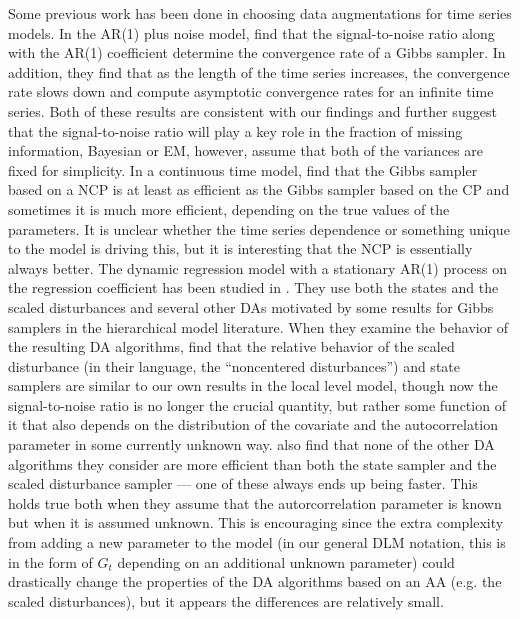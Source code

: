 \documentclass{article}
\begin{document}
Some previous work has been done in choosing data augmentations for time series models. In the AR(1) plus noise model, \citet{pitt1999analytic} find that the signal-to-noise ratio along with the AR(1) coefficient determine the convergence rate of a Gibbs sampler. In addition, they find that as the length of the time series increases, the convergence rate slows down and compute asymptotic convergence rates for an infinite time series. Both of these results are consistent with our findings and further suggest that the signal-to-noise ratio will play a key role in the fraction of missing information, Bayesian or EM, however, \citet{pitt1999analytic} assume that both of the variances are fixed for simplicity. In a continuous time model, \citet{roberts2004bayesian} find that the Gibbs sampler based on a NCP is at least as efficient as the Gibbs sampler based on the CP and sometimes it is much more efficient, depending on the true values of the parameters. It is unclear whether the time series dependence or something unique to the model is driving this, but it is interesting that the NCP is essentially always better. The dynamic regression model with a stationary AR(1) process on the regression coefficient has been studied in \citet{fruhwirth2004efficient}. They use both the states and the scaled disturbances and several other DAs motivated by some results for Gibbs samplers in the hierarchical model literature. When they examine the behavior of the resulting DA algorithms, \citet{fruhwirth2004efficient} find that the relative behavior of the scaled disturbance (in their language, the ``noncentered disturbances'') and state samplers are similar to our own results in the local level model, though now the signal-to-noise ratio is no longer the crucial quantity, but rather some function of it that also depends on the distribution of the covariate and the autocorrelation parameter in some currently unknown way. \citet{fruhwirth2004efficient} also find that none of the other DA algorithms they consider are more efficient than both the state sampler and the scaled disturbance sampler --- one of these always ends up being faster. This holds true both when they assume that the autorcorrelation parameter is known but when it is assumed unknown. This is encouraging since the extra complexity from adding a new parameter to the model (in our general DLM notation, this is in the form of $G_t$ depending on an additional unknown parameter) could drastically change the properties of the DA algorithms based on an AA (e.g. the scaled disturbances), but it appears the differences are relatively small.





\clearpage



\end{document}
